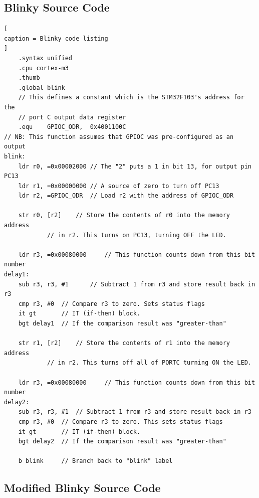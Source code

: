 \documentclass{UoNMCHA}
\numberwithin{equation}{section}
\begin{document}
\subsection{Blinky Source Code}

\begin{lstlisting}[
caption = Blinky code listing
]
    .syntax unified
    .cpu cortex-m3
    .thumb
    .global blink
    // This defines a constant which is the STM32F103's address for the
    // port C output data register
    .equ	GPIOC_ODR,	0x4001100C
// NB: This function assumes that GPIOC was pre-configured as an output
blink:
	ldr r0, =0x00002000 // The "2" puts a 1 in bit 13, for output pin PC13
	ldr r1, =0x00000000 // A source of zero to turn off PC13
	ldr r2, =GPIOC_ODR  // Load r2 with the address of GPIOC_ODR

	str r0, [r2] 	// Store the contents of r0 into the memory address
			// in r2. This turns on PC13, turning OFF the LED.

	ldr r3, =0x00080000 	// This function counts down from this bit number
delay1:
	sub r3, r3, #1   	// Subtract 1 from r3 and store result back in r3
	cmp r3, #0	// Compare r3 to zero. Sets status flags
	it gt		// IT (if-then) block.
	bgt delay1	// If the comparison result was "greater-than"

	str r1, [r2]	// Store the contents of r1 into the memory address
			// in r2. This turns off all of PORTC turning ON the LED.

	ldr r3, =0x00080000 	// This function counts down from this bit number
delay2:
	sub r3, r3, #1	// Subtract 1 from r3 and store result back in r3
	cmp r3, #0	// Compare r3 to zero. This sets status flags
	it gt		// IT (if-then) block.
	bgt delay2	// If the comparison result was "greater-than"

	b blink		// Branch back to "blink" label
\end{lstlisting}

\newpage

\subsection{Modified Blinky Source Code} \label{modified}
\end{document}
